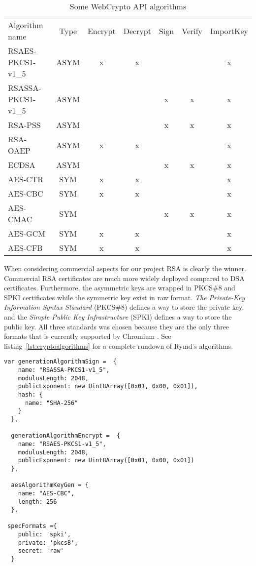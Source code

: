 \begin{table}[ht]
\centering
\begin{tabular}{lcccccc}
Algorithm name & Type & Encrypt & Decrypt & Sign & Verify & ImportKey \\
RSAES-PKCS1-v1\_5 & ASYM & x & x &  &  & x \\
RSASSA-PKCS1-v1\_5 & ASYM &  &  & x & x & x \\
RSA-PSS & ASYM &  &  & x & x & x \\
RSA-OAEP & ASYM & x & x &  &  & x \\
ECDSA & ASYM &  &  & x & x & x \\
AES-CTR & SYM & x & x &  &  & x \\
AES-CBC & SYM & x & x &  &  & x \\
AES-CMAC & SYM &  &  & x & x & x \\
AES-GCM & SYM & x & x &  &  & x \\
AES-CFB & SYM & x & x &  &  & x
\end{tabular}
\caption{Some WebCrypto API algorithms}
\label{table:webcrypoapi}
\end{table}

When considering commercial aspects for our project RSA is clearly the winner. Commercial RSA certificates are much more widely deployed compared to DSA certificates. Furthermore, the asymmetric keys are wrapped in PKCS\#8 and SPKI certificates while the symmetric key exist in raw format. \emph{The Private-Key Information Syntax Standard} (PKCS\#8) defines a way to store the private key, and the \emph{Simple Public Key Infrastructure} (SPKI) defines a way to store the public key. All three standards was chosen because they are the only three formats that is currently supported by Chromium \cite{ImplementedChromium:Online}. See listing~\ref{lst:cryptoalgorithms} for a complete rundown of Rymd's algorithms.

\begin{Code}
\begin{lstlisting}[caption={Algorithms implemented}, label={lst:cryptoalgorithms}]
  var generationAlgorithmSign =  {
    name: "RSASSA-PKCS1-v1_5",
    modulusLength: 2048,
    publicExponent: new Uint8Array([0x01, 0x00, 0x01]),
    hash: {
      name: "SHA-256"
    }
  },

  generationAlgorithmEncrypt =  {
    name: "RSAES-PKCS1-v1_5",
    modulusLength: 2048,
    publicExponent: new Uint8Array([0x01, 0x00, 0x01])
  },

  aesAlgorithmKeyGen = {
    name: "AES-CBC",
    length: 256
  },

 specFormats ={
    public: 'spki',
    private: 'pkcs8',
    secret: 'raw'
  }
\end{lstlisting}
\end{Code}

